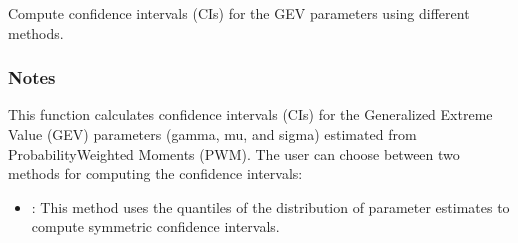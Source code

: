 \documentclass[a4paper,11pt,openany,english]{sphinxmanual}
\begin{document}
\begin{fulllineitems}
\begin{sphinxVerbatim}[commandchars=\\\{\}]
     
  
\end{sphinxVerbatim}

\begin{fulllineitems}
\label{\detokenize{api_topt:xtremes.topt.PWM_estimators.get_CIs}}
\pysigstartsignatures
{}
\pysigstopsignatures
\sphinxAtStartPar
Compute confidence intervals (CIs) for the GEV parameters using different methods.


\subsubsection{Notes}
\label{\detokenize{api_topt:id28}}
\sphinxAtStartPar
This function calculates confidence intervals (CIs) for the Generalized Extreme Value (GEV) parameters (gamma, mu, and sigma) estimated from 
Probability\sphinxhyphen{}Weighted Moments (PWM). The user can choose between two methods for computing the confidence intervals:
\begin{itemize}
\item {} 
\sphinxAtStartPar
{}: This method uses the quantiles of the distribution of parameter estimates to compute symmetric confidence intervals.


\end{itemize}
\end{fulllineitems}
\end{fulllineitems}
\end{document}
